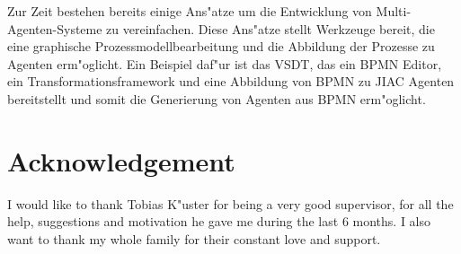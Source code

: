 Zur Zeit bestehen bereits einige Ans"atze um die Entwicklung von Multi-Agenten-Systeme zu vereinfachen. Diese Ans"atze stellt Werkzeuge bereit, die eine graphische Prozessmodellbearbeitung und die Abbildung der Prozesse zu Agenten erm"oglicht. Ein Beispiel daf"ur ist das VSDT, das ein BPMN Editor, ein Transformationsframework und eine Abbildung von BPMN zu JIAC Agenten bereitstellt und somit die Generierung von Agenten aus BPMN erm"oglicht.

\newpage



\section*{Acknowledgement}
I would like to thank Tobias K"uster for being a very good supervisor, for all the help, suggestions and motivation he gave me during the last 6 months.
I also want to thank my whole family for their constant love and support. 


